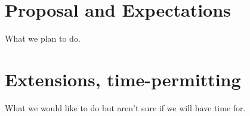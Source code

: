 \documentclass[tog]{acmsiggraph}
\begin{document}
\section{Proposal and Expectations}

What we plan to do.

\section{Extensions, time-permitting}

What we would like to do but aren't sure if we will have time for.




\end{document}
